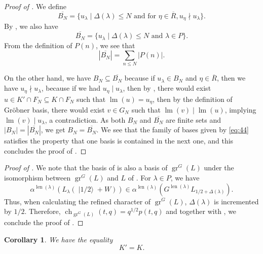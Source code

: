 \documentclass[a4paper, 12pt, reqno]{amsart}
\newtheorem{corollary}[theorem]{Corollary}
\theoremstyle{remark}
\numberwithin{equation}{subsection}
\DeclareMathOperator{\gr}{gr}
\DeclareMathOperator{\ch}{ch}
\DeclareMathOperator{\lm}{lm}
\DeclareMathOperator{\len}{len}
\DeclareMathOperator{\vachalf}{|1/2\rangle}
\begin{document}
\begin{proof}[Proof of ]
  We define
  \begin{equation*}
    \overline{B_N} = \{u_{\lambda} \mid \Delta(\lambda) \le N\text{ and for }\eta \in \overline{R}, u_{\eta} \nmid u_{\lambda}\}.
  \end{equation*}
  By , we also have
  \begin{equation*}
    \overline{B_N} = \{u_{\lambda} \mid \Delta(\lambda) \le N\text{ and }\lambda \in P\}.
  \end{equation*}
  From the definition of $P(n)$, we see that
  \begin{equation*}
    |\overline{B_N}| = \sum_{n \le N}|P(n)|.
  \end{equation*}

  On the other hand, we have $B_N \subseteq \overline{B_N}$ because if $u_{\lambda} \in B_N$ and $\eta \in \overline{R}$, then we have $u_{\eta} \nmid u_{\lambda}$, because if we had $u_{\eta} \mid u_{\lambda}$, then by , there would exist $u \in K' \cap F_N \subseteq K \cap F_N$ such that $\lm(u) = u_{\eta}$, then by the definition of Gr\"{o}bner basis, there would exist $v \in G_N$ such that $\lm(v) \mid \lm(u)$, implying $\lm(v) \mid u_{\lambda}$, a contradiction.
  As both $B_N$ and $\overline{B_N}$ are finite sets and $|B_N| = |\overline{B_N}|$, we get $B_N = \overline{B_N}$.
  We see that the family of bases given by \eqref{eq:44} satisfies the property that one basis is contained in the next one, and this concludes the proof of .
\end{proof}

\begin{proof}[Proof of ]
  We note that the basis of  is also a basis of $\gr^G(L)$ under the isomorphism between $\gr^G(L)$ and $L$ of .
  For $\lambda \in P$, we have
  \begin{equation*}
    \alpha^{\len(\lambda)}(L_{\lambda}(\vachalf + W)) \in \alpha^{\len(\lambda)}(G^{\len(\lambda)}L_{1/2 + \Delta(\lambda)}).
  \end{equation*}
  Thus, when calculating the refined character of $\gr^G(L)$, $\Delta(\lambda)$ is incremented by $1/2$.
  Therefore, $\ch_{\gr^G(L)}(t, q) = q^{1/2}p(t, q)$ and together with , we conclude the proof of .
\end{proof}

\begin{corollary}
  \label{crl:3}
  We have the equality
  \begin{equation*}
    K' = K.
  \end{equation*}
\end{corollary}
\end{document}
